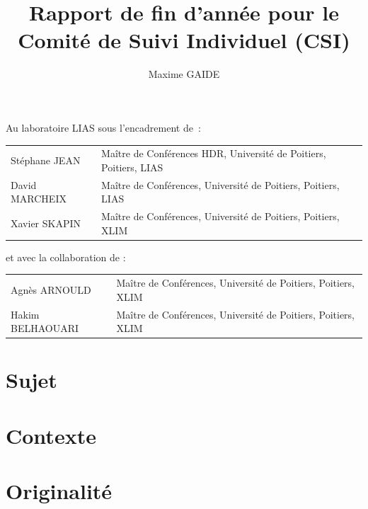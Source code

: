 \documentclass[a4paper,11pt]{article}
\title{Rapport de fin d'année pour le Comité de Suivi Individuel (CSI)}
\author{Maxime GAIDE}
\begin{document}
\begin{titlepage}
  \clearpage\maketitle
  \thispagestyle{empty}

  \vfill \noindent Au laboratoire LIAS sous l'encadrement de :

  \noindent

  \begin{center}
    \begin{tabular}{ll}
      Stéphane JEAN & \small Maître de Conférences HDR, Université de Poitiers, Poitiers, LIAS\\[0pt]
      David MARCHEIX & \small Maître de Conférences, Université de Poitiers, Poitiers, LIAS\\[0pt]
      Xavier SKAPIN & \small Maître de Conférences, Université de Poitiers, Poitiers, XLIM\\[0pt]
    \end{tabular}
  \end{center}

  \vspace*{2em}
  \noindent et avec la collaboration de :

  \noindent
  \begin{center}
    \begin{tabular}{ll}
      Agnès ARNOULD & \small Maître de Conférences, Université de Poitiers, Poitiers, XLIM\\[0pt]
      Hakim BELHAOUARI & \small Maître de Conférences, Université de Poitiers, Poitiers, XLIM\\[0pt]
    \end{tabular}
  \end{center}

  \vspace{.15\textheight}
\end{titlepage}

\newpage

\section{Sujet}


\section{Contexte}


\section{Originalité}

\end{document}
